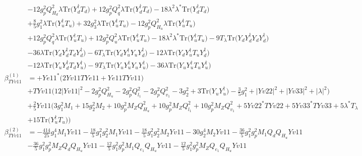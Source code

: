 \begin{align}
 &-12 g_{p}^{2} Q_{H_d}^{2} \lambda \mbox{Tr}\Big({Y_{d}^{\dagger}  T_d}\Big) +12 g_{p}^{2} Q_{q}^{2} \lambda \mbox{Tr}\Big({Y_{d}^{\dagger}  T_d}\Big) -18 \lambda^{2} \lambda^* \mbox{Tr}\Big({Y_{d}^{\dagger}  T_d}\Big) \nonumber \\ 
 &+\frac{8}{5} g_{1}^{2} \lambda \mbox{Tr}\Big({Y_{u}^{\dagger}  T_u}\Big) +32 g_{3}^{2} \lambda \mbox{Tr}\Big({Y_{u}^{\dagger}  T_u}\Big) -12 g_{p}^{2} Q_{H_u}^{2} \lambda \mbox{Tr}\Big({Y_{u}^{\dagger}  T_u}\Big) \nonumber \\ 
 &+12 g_{p}^{2} Q_{q}^{2} \lambda \mbox{Tr}\Big({Y_{u}^{\dagger}  T_u}\Big) +12 g_{p}^{2} Q_{u}^{2} \lambda \mbox{Tr}\Big({Y_{u}^{\dagger}  T_u}\Big) -18 \lambda^{2} \lambda^* \mbox{Tr}\Big({Y_{u}^{\dagger}  T_u}\Big) -9 T_{\lambda} \mbox{Tr}\Big({Y_d  Y_{d}^{\dagger}  Y_d  Y_{d}^{\dagger}}\Big) \nonumber \\ 
 &-36 \lambda \mbox{Tr}\Big({Y_d  Y_{d}^{\dagger}  T_d  Y_{d}^{\dagger}}\Big) -6 T_{\lambda} \mbox{Tr}\Big({Y_d  Y_{u}^{\dagger}  Y_u  Y_{d}^{\dagger}}\Big) -12 \lambda \mbox{Tr}\Big({Y_d  Y_{u}^{\dagger}  T_u  Y_{d}^{\dagger}}\Big) \nonumber \\ 
 &-12 \lambda \mbox{Tr}\Big({Y_u  Y_{d}^{\dagger}  T_d  Y_{u}^{\dagger}}\Big) -9 T_{\lambda} \mbox{Tr}\Big({Y_u  Y_{u}^{\dagger}  Y_u  Y_{u}^{\dagger}}\Big) -36 \lambda \mbox{Tr}\Big({Y_u  Y_{u}^{\dagger}  T_u  Y_{u}^{\dagger}}\Big) \\ 
\beta_{TYv11}^{(1)} & =  
+Ye11^* \Big(2 Yv11 TYe11  + Ye11 TYv11 \Big)\nonumber \\ 
 &+TYv11 \Big(12 |Yv11|^2  -2 g_{p}^{2} Q_{H_u}^{2}  -2 g_{p}^{2} Q_{l_1}^{2}  -2 g_{p}^{2} Q_{v_1}^{2}  -3 g_{2}^{2}  + 3 \mbox{Tr}\Big({Y_u  Y_{u}^{\dagger}}\Big)  -\frac{3}{5} g_{1}^{2}  + |Yv22|^2 + |Yv33|^2 + |\lambda|^2\Big)\nonumber \\ 
 &+\frac{2}{5} Yv11 \Big(3 g_{1}^{2} M_1 +15 g_{2}^{2} M_2 +10 g_{p}^{2} M_Z Q_{H_u}^{2} +10 g_{p}^{2} M_Z Q_{l_1}^{2} +10 g_{p}^{2} M_Z Q_{v_1}^{2} +5 Yv22^* TYv22 +5 Yv33^* TYv33 +5 \lambda^* T_{\lambda} \nonumber \\ 
 &+15 \mbox{Tr}\Big({Y_{u}^{\dagger}  T_u}\Big) \Big)\\ 
\beta_{TYv11}^{(2)} & =  
-\frac{414}{25} g_{1}^{4} M_1 Yv11 -\frac{18}{5} g_{1}^{2} g_{2}^{2} M_1 Yv11 -\frac{18}{5} g_{1}^{2} g_{2}^{2} M_2 Yv11 -30 g_{2}^{4} M_2 Yv11 -\frac{36}{5} g_{1}^{2} g_{p}^{2} M_1 Q_{d} Q_{H_u} Yv11 \nonumber \\ 
 &-\frac{36}{5} g_{1}^{2} g_{p}^{2} M_Z Q_{d} Q_{H_u} Yv11 -\frac{12}{5} g_{1}^{2} g_{p}^{2} M_1 Q_{e_{1}} Q_{H_u} Yv11 -\frac{12}{5} g_{1}^{2} g_{p}^{2} M_Z Q_{e_{1}} Q_{H_u} Yv11 \nonumber \\ 

\end{align}
